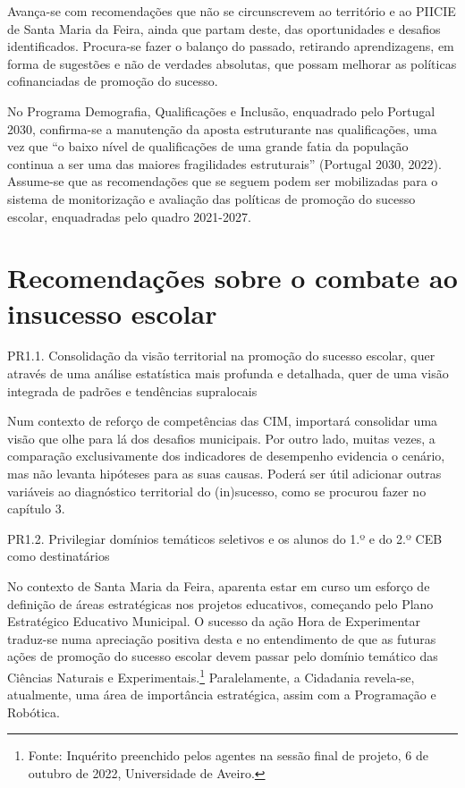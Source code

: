 \documentclass[
]{book}
\begin{document}
Avança-se com recomendações que não se circunscrevem ao território e ao PIICIE de Santa Maria da Feira, ainda que partam deste, das oportunidades e desafios identificados. Procura-se fazer o balanço do passado, retirando aprendizagens, em forma de sugestões e não de verdades absolutas, que possam melhorar as políticas cofinanciadas de promoção do sucesso.

No Programa Demografia, Qualificações e Inclusão, enquadrado pelo Portugal 2030, confirma-se a manutenção da aposta estruturante nas qualificações, uma vez que ``o baixo nível de qualificações de uma grande fatia da população continua a ser uma das maiores fragilidades estruturais'' (Portugal 2030, 2022). Assume-se que as recomendações que se seguem podem ser mobilizadas para o sistema de monitorização e avaliação das políticas de promoção do sucesso escolar, enquadradas pelo quadro 2021-2027.

\hypertarget{recomendauxe7uxf5es-sobre-o-combate-ao-insucesso-escolar}{%
\section{\texorpdfstring{\textbf{Recomendações sobre o combate ao insucesso escolar}}{Recomendações sobre o combate ao insucesso escolar}}\label{recomendauxe7uxf5es-sobre-o-combate-ao-insucesso-escolar}}

\leavevmode{}%
PR1.1. Consolidação da visão territorial na promoção do sucesso escolar, quer através de uma análise estatística mais profunda e detalhada, quer de uma visão integrada de padrões e tendências supralocais

Num contexto de reforço de competências das CIM, importará consolidar uma visão que olhe para lá dos desafios municipais. Por outro lado, muitas vezes, a comparação exclusivamente dos indicadores de desempenho evidencia o cenário, mas não levanta hipóteses para as suas causas. Poderá ser útil adicionar outras variáveis ao diagnóstico territorial do (in)sucesso, como se procurou fazer no capítulo 3.

\leavevmode{}%
PR1.2. Privilegiar domínios temáticos seletivos e os alunos do 1.º e do 2.º CEB como destinatários

No contexto de Santa Maria da Feira, aparenta estar em curso um esforço de definição de áreas estratégicas nos projetos educativos, começando pelo Plano Estratégico Educativo Municipal. O sucesso da ação Hora de Experimentar traduz-se numa apreciação positiva desta e no entendimento de que as futuras ações de promoção do sucesso escolar devem passar pelo domínio temático das Ciências Naturais e Experimentais.\footnote{Fonte: Inquérito preenchido pelos agentes na sessão final de projeto, 6 de outubro de 2022, Universidade de Aveiro.} Paralelamente, a Cidadania revela-se, atualmente, uma área de importância estratégica, assim com a Programação e Robótica.
\end{document}
